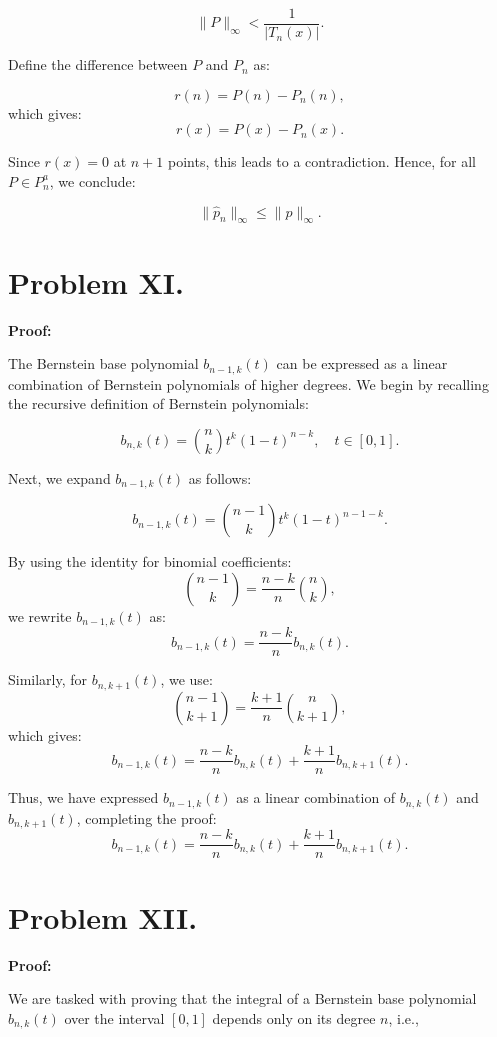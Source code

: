 \documentclass[a4paper]{article}
\renewcommand{\qed}{\hfill \boxed{\mathbb{Q.E.D.}}}
\begin{document}
\[
\|P\|_\infty < \frac{1}{|T_n(x)|}.
\]

Define the difference between \( P \) and \( P_n \) as:

\[
r(n) = P(n) - P_n(n),
\]
which gives:
\[
r(x) = P(x) - P_n(x).
\]

Since \( r(x) = 0 \) at \( n+1 \) points, this leads to a contradiction. Hence, for all \( P \in P^a_n \), we conclude:

\[
\|\hat{p}_n\|_\infty \leq \|p\|_\infty.
\]

\qed

\section*{Problem XI.}

\textbf{Proof:}

The Bernstein base polynomial \( b_{n-1,k}(t) \) can be expressed as a linear combination of Bernstein polynomials of higher degrees. We begin by recalling the recursive definition of Bernstein polynomials:

\[
b_{n,k}(t) = \binom{n}{k} t^k (1 - t)^{n-k}, \quad t \in [0,1].
\]

Next, we expand \( b_{n-1,k}(t) \) as follows:

\[
b_{n-1,k}(t) = \binom{n-1}{k} t^k (1 - t)^{n-1-k}.
\]

By using the identity for binomial coefficients:
\[
\binom{n-1}{k} = \frac{n-k}{n} \binom{n}{k},
\]
we rewrite \( b_{n-1,k}(t) \) as:
\[
b_{n-1,k}(t) = \frac{n-k}{n} b_{n,k}(t).
\]

Similarly, for \( b_{n,k+1}(t) \), we use:
\[
\binom{n-1}{k+1} = \frac{k+1}{n} \binom{n}{k+1},
\]
which gives:
\[
b_{n-1,k}(t) = \frac{n-k}{n} b_{n,k}(t) + \frac{k+1}{n} b_{n,k+1}(t).
\]

Thus, we have expressed \( b_{n-1,k}(t) \) as a linear combination of \( b_{n,k}(t) \) and \( b_{n,k+1}(t) \), completing the proof:
\[
b_{n-1,k}(t) = \frac{n-k}{n} b_{n,k}(t) + \frac{k+1}{n} b_{n,k+1}(t).
\]

\qed

\section*{Problem XII.}

\textbf{Proof:}

We are tasked with proving that the integral of a Bernstein base polynomial \( b_{n,k}(t) \) over the interval \([0,1]\) depends only on its degree \( n \), i.e.,
\end{document}
